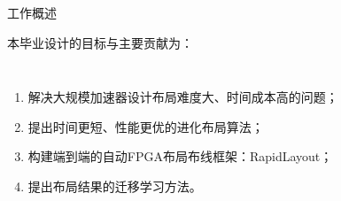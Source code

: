 \documentclass[10pt]{beamer}
\begin{document}
\begin{frame}{工作概述}

  本毕业设计的目标与主要贡献为：

  \begin{columns}[T, onlytextwidth]

    \vspace{0.5cm}

    \begin{enumerate}
      \setlength\itemsep{1.5em}
      \item 解决大规模加速器设计布局难度大、时间成本高的问题；
      \item 提出时间更短、性能更优的进化布局算法；
      \item 构建端到端的自动FPGA布局布线框架：RapidLayout；
      \item 提出布局结果的迁移学习方法。
    \end{enumerate}



\end{columns}
\end{frame}
\end{document}
